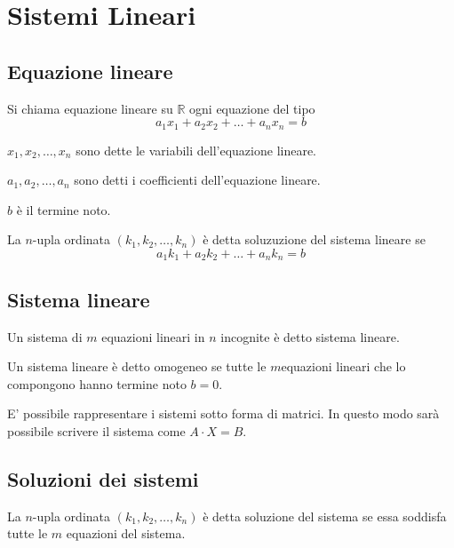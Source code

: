 \chapter{Sistemi Lineari}

\section{Equazione lineare}

\begin{definition}
Si chiama equazione lineare su $\mathbb{R}$ ogni equazione del tipo
$$ a_1x_1 + a_2x_2 + \ldots + a_nx_n = b$$
\end{definition}

$x_1, x_2, \ldots, x_n$ sono dette le variabili dell'equazione lineare.

$a_1, a_2, \ldots, a_n$ sono detti i coefficienti dell'equazione lineare.

$b$ è il termine noto.

\begin{definition}
La $n$-upla ordinata $(k_1, k_2, \ldots, k_n)$ è detta soluzuzione del sistema lineare se $$ a_1k_1 + a_2k_2 + \ldots + a_nk_n = b$$
\end{definition}

\section{Sistema lineare}

\begin{definition}
Un sistema di $m$ equazioni lineari in $n$ incognite è detto sistema lineare.
\end{definition}

\begin{definition}
Un sistema lineare è detto omogeneo se tutte le $m$equazioni lineari che lo compongono hanno termine noto $b=0$.
\end{definition}

E' possibile rappresentare i sistemi sotto forma di matrici. In questo modo sarà possibile scrivere il sistema come $A \cdot X=B$.

\section{Soluzioni dei sistemi}

\begin{definition}
La $n$-upla ordinata $(k_1, k_2, \ldots, k_n)$ è detta soluzione del sistema se essa soddisfa tutte le $m$ equazioni del sistema.
\end{definition}


